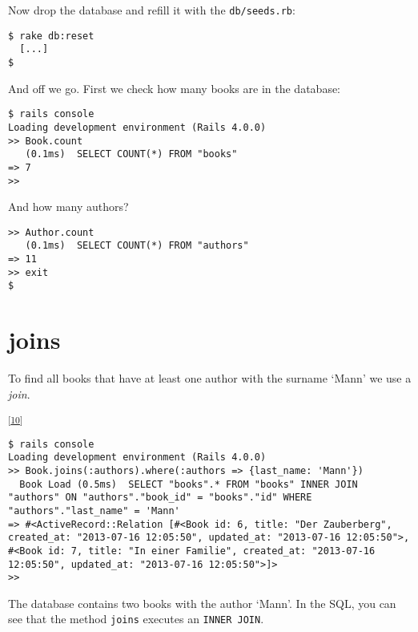 \documentclass[a4paper]{book}
\newcounter{tab}[chapter]
\begin{document}
Now drop the database and refill it with the \texttt{db/seeds.rb}:

\begin{shaded}\begin{verbatim}
$ rake db:reset
  [...]
$
\end{verbatim}\end{shaded}

And off we go. First we check how many books are in the database:

\begin{shaded}\begin{verbatim}
$ rails console
Loading development environment (Rails 4.0.0)
>> Book.count
   (0.1ms)  SELECT COUNT(*) FROM "books"
=> 7
>>
\end{verbatim}\end{shaded}

And how many authors?

\begin{shaded}\begin{verbatim}
>> Author.count
   (0.1ms)  SELECT COUNT(*) FROM "authors"
=> 11
>> exit
$
\end{verbatim}\end{shaded}

\section{joins}\label{joins}

To find all books that have at least one author with the surname `Mann' we use a \emph{join}.

\textsuperscript{{[}\hyperref[ftn.idp4450352]{10}{]}}

\begin{shaded}\begin{verbatim}
$ rails console
Loading development environment (Rails 4.0.0)
>> Book.joins(:authors).where(:authors => {last_name: 'Mann'})
  Book Load (0.5ms)  SELECT "books".* FROM "books" INNER JOIN "authors" ON "authors"."book_id" = "books"."id" WHERE "authors"."last_name" = 'Mann'
=> #<ActiveRecord::Relation [#<Book id: 6, title: "Der Zauberberg", created_at: "2013-07-16 12:05:50", updated_at: "2013-07-16 12:05:50">, #<Book id: 7, title: "In einer Familie", created_at: "2013-07-16 12:05:50", updated_at: "2013-07-16 12:05:50">]>
>>
\end{verbatim}\end{shaded}

The database contains two books with the author `Mann'. In the SQL, you can see that the method \texttt{joins} executes an \texttt{INNER JOIN}.
\end{document}
